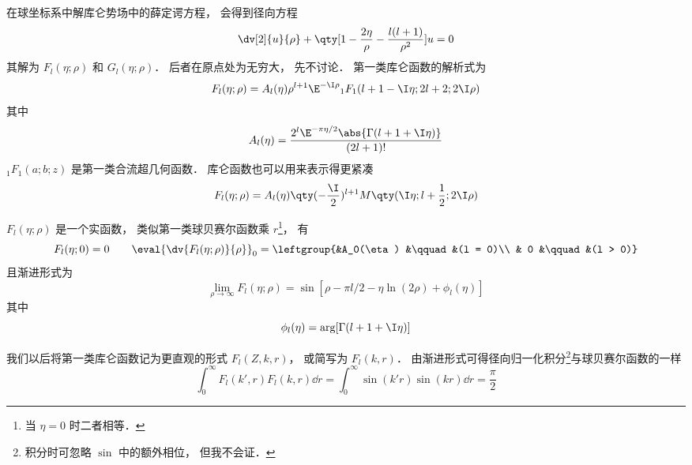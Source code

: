 
在球坐标系中解库仑势场中的薛定谔方程， %
会得到径向方程
\begin{equation}
\dv[2]{u}{\rho} + \qty[1 - \frac{2\eta}{\rho} - \frac{l(l+1)}{\rho^2}]u = 0
\end{equation}
其解为 $F_l(\eta; \rho)$ 和 $G_l(\eta; \rho)$． 后者在原点处为无穷大， 先不讨论． 第一类库仑函数的解析式为
\begin{equation}
F_l(\eta; \rho) = A_l(\eta) \rho^{l+1} \E^{-\I\rho} {_1F_1}(l+1-\I\eta; 2l+2; 2\I\rho)
\end{equation}
其中
\begin{equation}
A_l(\eta) = \frac{2^l \E^{-\pi\eta/2} \abs{\Gamma(l+1+\I\eta)}}{(2l+1)!}
\end{equation}
$_1 F_1(a;b;z)$ 是第一类合流超几何函数． 库仑函数也可以用来表示得更紧凑
\begin{equation}
F_l(\eta; \rho) = A_l(\eta) \qty(-\frac{\I}{2})^{l+1} M\qty(\I\eta; l+\frac12; 2\I\rho)
\end{equation}

$F_l(\eta; \rho)$ 是一个实函数， 类似第一类球贝赛尔函数乘 $r$\footnote{当 $\eta = 0$ 时二者相等．}， 有
\begin{equation}
F_l(\eta; 0) = 0 \qquad \eval{\dv{F_l(\eta; \rho)}{\rho}}_0 = 
\leftgroup{&A_0(\eta) &\qquad &(l = 0)\\ & 0 &\qquad &(l > 0)}
\end{equation}
且渐进形式为
\begin{equation}
\lim_{\rho\to \infty} F_l(\eta; \rho) = \sin[\rho - \pi l/2 - \eta\ln(2\rho) + \phi_l(\eta)]
\end{equation}
其中
\begin{equation}
\phi_l(\eta) = \arg[\Gamma(l+1+\I\eta)]
\end{equation}

我们以后将第一类库仑函数记为更直观的形式 $F_l(Z, k, r)$， 或简写为 $F_l(k, r)$． 由渐进形式可得径向归一化积分\footnote{积分时可忽略 $\sin$ 中的额外相位， 但我不会证．}与球贝赛尔函数的一样
\begin{equation}
\int_0^\infty F_l(k', r)F_l(k, r) \dd{r} = \int_0^\infty \sin(k'r)\sin(kr) \dd{r} = \frac{\pi}{2}
\end{equation}
